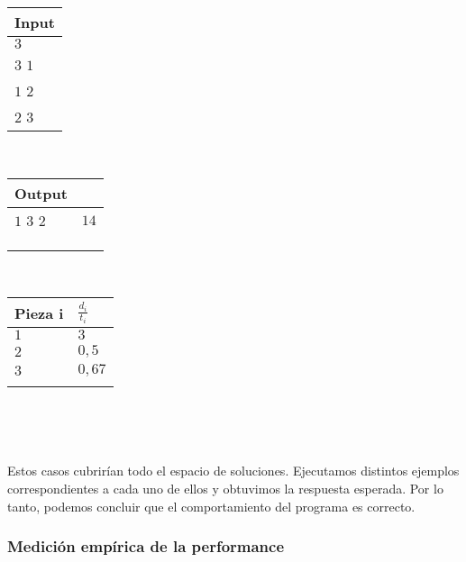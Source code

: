 \documentclass[11pt, a4paper, twoside]{article}
\begin{document}
\begin{enumerate}
\begin{itemize}
		\begin{minipage}{0.2\textwidth}
			\begin{tabular}{l}
				Input  \\
				\hline
				$3$   \\
				$3$ $1$ \\
				$1$ $2$ \\
				$2$ $3$ \\
			\end{tabular} \\ 
		\end{minipage}
		\begin{minipage}{0.3\textwidth}
			\begin{tabular}{ll}
				Output  \\
				\hline
				$1$ $3$ $2$ & $14$ \\
				\\
				\\
				\\
			\end{tabular} \\ 
		\end{minipage}  
        	\begin{minipage}{0.2\textwidth}
			\begin{tabular}{l|l}
				Pieza i & $\frac{d_i}{t_i}$  \\
				\hline
				$1$     & $3$ \\
				$2$     & $0,5$ \\
				$3$     & $0,67$ \\
				\\
			\end{tabular} \\ 
		\end{minipage}  \\		
		
	\end{itemize}
	
\end{enumerate}

Estos casos cubrirían todo el espacio de soluciones. Ejecutamos distintos ejemplos correspondientes a cada uno de ellos y obtuvimos la respuesta esperada. Por lo tanto, podemos concluir que el comportamiento del programa es correcto. 

\subsubsection{Medición empírica de la performance}

\end{document}
